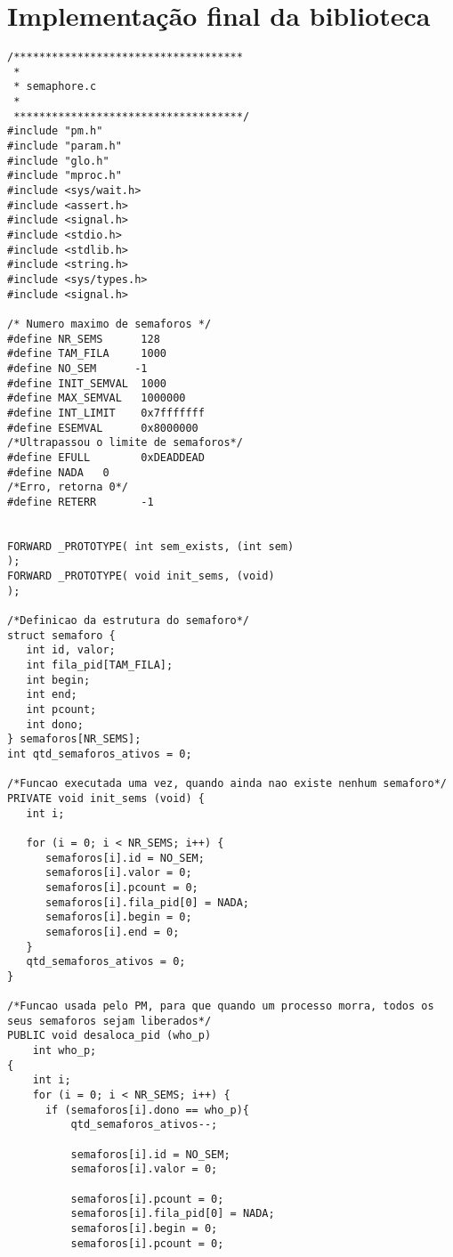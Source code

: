 \documentclass[brazil, a4paper]{scrartcl}
\begin{document}
\appendix 
\section{Implementação final da biblioteca}

\begin{lstlisting}[style=customc]
/************************************
 * 
 * semaphore.c
 * 
 ************************************/ 
#include "pm.h"
#include "param.h"
#include "glo.h"
#include "mproc.h"
#include <sys/wait.h>
#include <assert.h>
#include <signal.h>
#include <stdio.h>
#include <stdlib.h>
#include <string.h>
#include <sys/types.h>
#include <signal.h>

/* Numero maximo de semaforos */
#define NR_SEMS      128        
#define TAM_FILA     1000       
#define NO_SEM      -1          
#define INIT_SEMVAL  1000       
#define MAX_SEMVAL   1000000    
#define INT_LIMIT    0x7fffffff 
#define ESEMVAL      0x8000000
/*Ultrapassou o limite de semaforos*/  
#define EFULL        0xDEADDEAD
#define NADA   0
/*Erro, retorna 0*/          
#define RETERR       -1          


FORWARD _PROTOTYPE( int sem_exists, (int sem)                            );
FORWARD _PROTOTYPE( void init_sems, (void)                              );

/*Definicao da estrutura do semaforo*/
struct semaforo {
   int id, valor; 
   int fila_pid[TAM_FILA]; 
   int begin;
   int end; 
   int pcount;
   int dono;
} semaforos[NR_SEMS];
int qtd_semaforos_ativos = 0;

/*Funcao executada uma vez, quando ainda nao existe nenhum semaforo*/
PRIVATE void init_sems (void) {
   int i;

   for (i = 0; i < NR_SEMS; i++) {
      semaforos[i].id = NO_SEM;
      semaforos[i].valor = 0;
      semaforos[i].pcount = 0; 
      semaforos[i].fila_pid[0] = NADA;  
      semaforos[i].begin = 0;
      semaforos[i].end = 0;
   }
   qtd_semaforos_ativos = 0;
}

/*Funcao usada pelo PM, para que quando um processo morra, todos os seus semaforos sejam liberados*/
PUBLIC void desaloca_pid (who_p)
    int who_p;
{
    int i;
    for (i = 0; i < NR_SEMS; i++) {
      if (semaforos[i].dono == who_p){
          qtd_semaforos_ativos--;

          semaforos[i].id = NO_SEM;
          semaforos[i].valor = 0;

          semaforos[i].pcount = 0;
          semaforos[i].fila_pid[0] = NADA;
          semaforos[i].begin = 0;
          semaforos[i].pcount = 0;


\end{lstlisting}
\end{document}
